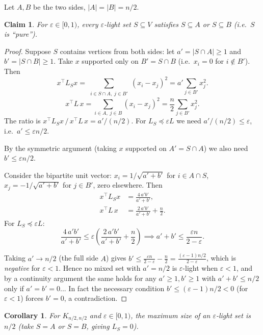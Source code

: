 \documentclass[12pt]{article}
\newtheorem{claim}[theorem]{Claim}
\newtheorem{corollary}[theorem]{Corollary}
\theoremstyle{definition}
\theoremstyle{remark}
\begin{document}
\label{sec:bipartite}

Let $A, B$ be the two sides, $|A|=|B|=n/2$.

\begin{claim}
For $\varepsilon \in [0,1)$, every $\varepsilon$-light set $S \subseteq V$ satisfies $S \subseteq A$ or $S \subseteq B$ (i.e.\ $S$ is ``pure'').
\end{claim}

\begin{proof}
Suppose $S$ contains vertices from both sides: let $a' = |S \cap A| \ge 1$ and $b' = |S \cap B| \ge 1$.
Take $x$ supported only on $B' = S \cap B$ (i.e.\ $x_i = 0$ for $i \notin B'$).
Then
\[
  x^\top L_S x = \sum_{\substack{i \in S \cap A,\; j \in B'}} (x_i - x_j)^2
               = a' \sum_{j \in B'} x_j^2.
\]
\[
  x^\top L\, x = \sum_{i \in A,\; j \in B} (x_i - x_j)^2
               = \frac{n}{2} \sum_{j \in B'} x_j^2.
\]
The ratio is $x^\top L_S x \,/\, x^\top L\,x = a'/(n/2)$.
For $L_S \preceq \varepsilon L$ we need $a'/(n/2) \le \varepsilon$, i.e.\ $a' \le \varepsilon n/2$.

By the symmetric argument (taking $x$ supported on $A' = S \cap A$) we also need $b' \le \varepsilon n/2$.

Consider the bipartite unit vector: $x_i = 1/\sqrt{a'+b'}$ for $i \in A \cap S$,
$x_j = -1/\sqrt{a'+b'}$ for $j \in B'$, zero elsewhere.  Then
\begin{align*}
  x^\top L_S x &= \frac{4\,a'b'}{a'+b'},\\
  x^\top L\,x &= \frac{2\,a'b'}{a'+b'} + \frac{n}{2}.
\end{align*}
For $L_S \preceq \varepsilon L$:
\[
  \frac{4\,a'b'}{a'+b'} \le \varepsilon\!\left(\frac{2\,a'b'}{a'+b'} + \frac{n}{2}\right)
  \implies
  a'+b' \le \frac{\varepsilon n}{2-\varepsilon}.
\]

Taking $a' \to n/2$ (the full side $A$) gives $b' \le \frac{\varepsilon n}{2-\varepsilon} - \frac{n}{2} = \frac{(\varepsilon-1)n/2}{2-\varepsilon}$, which is \emph{negative} for $\varepsilon < 1$.  Hence no mixed set with $a' = n/2$ is $\varepsilon$-light when $\varepsilon < 1$, and by a continuity argument the same holds for any $a' \ge 1, b' \ge 1$ with $a' + b' \le n/2$ only if $a' = b' = 0$... In fact the necessary condition $b' \le (\varepsilon - 1)n/2 < 0$ (for $\varepsilon < 1$) forces $b' = 0$, a contradiction.
\end{proof}

\begin{corollary}
For $K_{n/2,n/2}$ and $\varepsilon \in [0,1)$, the maximum size of an $\varepsilon$-light set is $n/2$ (take $S = A$ or $S = B$, giving $L_S = 0$).
\end{corollary}
\end{document}
